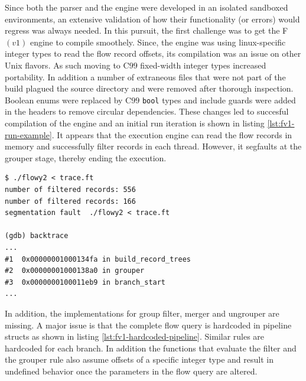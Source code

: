 Since both the parser and the engine were developed in an isolated sandboxed
environments, an extensive validation of how their functionality (or errors)
would regress was always needed. In this pursuit, the first challenge was to
get the F$(v1)$ engine to compile smoothely. Since, the engine was using
linux-specific integer types to read the flow record  offsets, its compilation was an issue on other Unix
flavors. As such moving to C$99$ \cite{c99:1999} fixed-width integer types
increased portability. In addition a number of extraneous files that were not
part of the build plagued the source directory and were removed after thorough
inspection. Boolean enums were replaced by C$99$ \texttt{bool} types and
include guards were added in the headers to remove circular dependencies.
These changes led to succesful compilation of the engine and an initial run
iteration is shown in listing \ref{lst:fv1-run-example}. It appears that the
execution engine can read the flow records in memory and successfully filter
records in each thread.  However, it segfaults at the grouper stage, thereby
ending the execution.

\begin{lstlisting}
$ ./flowy2 < trace.ft
number of filtered records: 556
number of filtered records: 166
segmentation fault  ./flowy2 < trace.ft

(gdb) backtrace
...
#1  0x00000001000134fa in build_record_trees
#2  0x00000001000138a0 in grouper
#3  0x0000000100011eb9 in branch_start
...
\end{lstlisting}

In addition, the implementations for group filter, merger and ungrouper are
missing. A major issue is that the complete flow query is hardcoded in
pipeline 
structs as shown in listing \ref{lst:fv1-hardcoded-pipeline}. Similar rules
are hardcoded for each branch. In addition the functions that evaluate the
filter and the grouper rule also assume offsets of a specific integer type and
result in undefined behavior once the parameters in the flow query are
altered.

